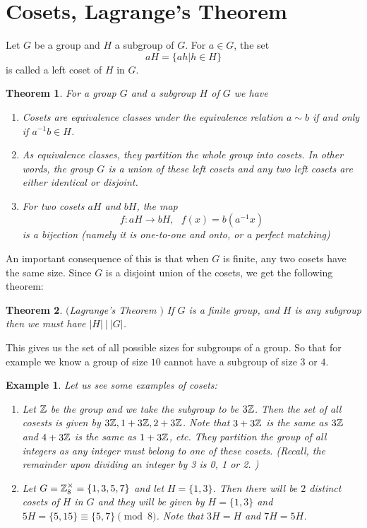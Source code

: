 \documentclass[12pt]{article}
\theoremstyle{plain}
\newtheorem{example}{Example}
\newtheorem{theorem}{Theorem}
\theoremstyle{definition}
\theoremstyle{remark}
\begin{document}
\section{Cosets, Lagrange's Theorem}
Let $G$ be a group and $H$ a subgroup of $G$. For $a\in G$, the set
$$aH = \{ah|h\in H\}$$
is called a left coset of $H$ in $G$.
\begin{theorem}
For a group $G$ and a subgroup $H$ of $G$ we have
\begin{enumerate}
    \item Cosets are equivalence classes under the equivalence relation $a\sim b$ if and only if $a^{-1}b \in H$.
    \item As equivalence classes, they partition the whole group into cosets. In other words, the group $G$ is a union of these left cosets and any two left cosets are either identical or disjoint.
    \item For two cosets $aH$ and $bH$, the map
    $$f:aH\rightarrow bH, \:\:\: f(x) = b(a^{-1}x)$$
is a bijection (namely it is one-to-one and onto, or a perfect matching)
\end{enumerate}
\end{theorem}
An important consequence of this is that when $G$ is finite, any two cosets have the same size. Since $G$ is a disjoint union of the cosets, we get the following theorem:
\begin{theorem}$($Lagrange's Theorem $)$
If $G$ is a finite group, and $H$ is any subgroup then we must have $|H| \: | \: |G|$.
\end{theorem}
This gives us the set of all possible sizes for subgroups of a group. So that for example we know a group of size $10$ cannot have a subgroup of size $3$ or $4$.
\begin{example}
Let us see some examples of cosets:
\begin{enumerate}
    \item Let $\mathbb{Z}$ be the group and we take the subgroup to be $3\mathbb{Z}$. Then the set of all cosests is given by
    $3\mathbb{Z}, 1+3\mathbb{Z}, 2+3\mathbb{Z}$. Note that $3+3\mathbb{Z}$ is the same as $3\mathbb{Z}$ and $4+3\mathbb{Z}$ is the same as $1+3\mathbb{Z}$, etc. They partition the group of all integers as any integer must belong to one of these cosets. (Recall, the remainder upon dividing an integer by 3 is 0, 1 or 2. )
    \item Let $G=\mathbb{Z}_{8}^{\times} = \{1,3,5,7\}$ and let $H = \{1,3\}$. Then there will be $2$ distinct cosets of $H$ in $G$ and they will be given by $H = \{1,3\}$ and $5H = \{5, 15\} \equiv \{5,7\} \pmod{8}$. Note that $3H = H$ and $7H=5H$.
 \end{enumerate}
\end{example}
\end{document}
